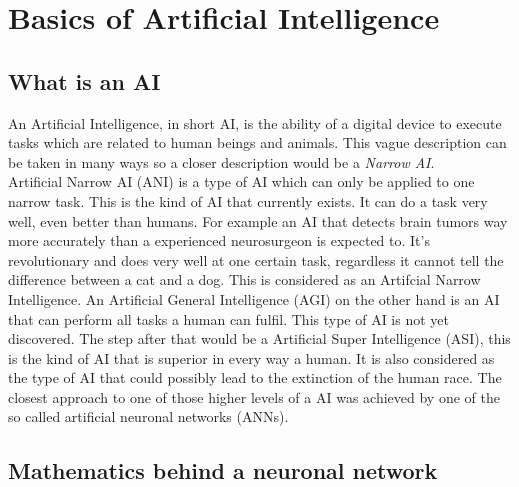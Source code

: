 \documentclass[12pt]{article}
\begin{document}
\section{Basics of Artificial Intelligence}
\subsection{What is an AI}
An Artificial Intelligence, in short AI, is the ability of a digital device to execute tasks which are related to human beings and animals. This vague description can be taken in many ways so a closer description would be a \textit{Narrow AI}. \cite{aibritannica}\\
Artificial Narrow AI (ANI) is a type of AI which can only be applied to one narrow task. This is the kind of AI that currently exists. It can do a task very well, even better than humans. For example an AI that detects brain tumors way more accurately than a experienced neurosurgeon is expected to. It's revolutionary and does very well at one certain task, regardless it cannot tell the difference between a cat and a dog. This is considered as an Artifcial Narrow Intelligence. An Artificial General Intelligence (AGI) on the other hand is an AI that can perform all tasks a human can fulfil. This type of AI is not yet discovered. The step after that would be a Artificial Super Intelligence (ASI), this is the kind of AI that is superior in every way a human. It is also considered as the type of AI that could possibly lead to the extinction of the human race. The closest approach to one of those higher levels of a AI was achieved by one of the so called artificial neuronal networks (ANNs).
\cite{narrowAI}
\subsection{Mathematics behind a neuronal network}
\end{document}
